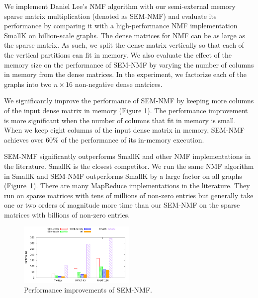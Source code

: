\documentclass[simplex.tex]{subfiles}
\begin{document}
We implement Daniel Lee’s NMF algorithm with our semi-external memory
sparse matrix multiplication (denoted as SEM-NMF) and evaluate its
performance by comparing it with a high-performance NMF implementation
SmallK on billion-scale graphs. The dense matrices for NMF can be as
large as the sparse matrix. As such, we split the dense matrix
vertically so that each of the vertical partitions can fit in memory. We
also evaluate the effect of the memory size on the performance of
SEM-NMF by varying the number of columns in memory from the dense
matrices. In the experiment, we factorize each of the graphs
into two $n \times 16$ non-negative dense matrices.


We significantly improve the performance of SEM-NMF by keeping more
columns of the input dense matrix in memory (Figure \ref{fig:nmf}). The
performance improvement is more significant when the number of columns
that fit in memory is small. When we keep eight columns of the input
dense matrix in memory, SEM-NMF achieves over 60\% of the performance of
its in-memory execution.


SEM-NMF significantly outperforms SmallK and other NMF implementations
in the literature. SmallK is the closest competitor. We run the same NMF
algorithm in SmallK and SEM-NMF outperforms SmallK by a large factor on
all graphs (Figure~\ref{fig:nmf}). There are many MapReduce
implementations in the literature. They run on sparse matrices with tens
of millions of non-zero entries but generally take one or two orders of
magnitude more time than our SEM-NMF on the sparse matrices with
billions of non-zero entries.


\begin{figure}[h!]
\begin{cframed}
\centering
\includegraphics[width=0.5\textwidth]{../../figs/nmf.png}
\caption{
Performance improvements of SEM-NMF.
}
\label{fig:nmf}
\end{cframed}
\end{figure}
\end{document}
